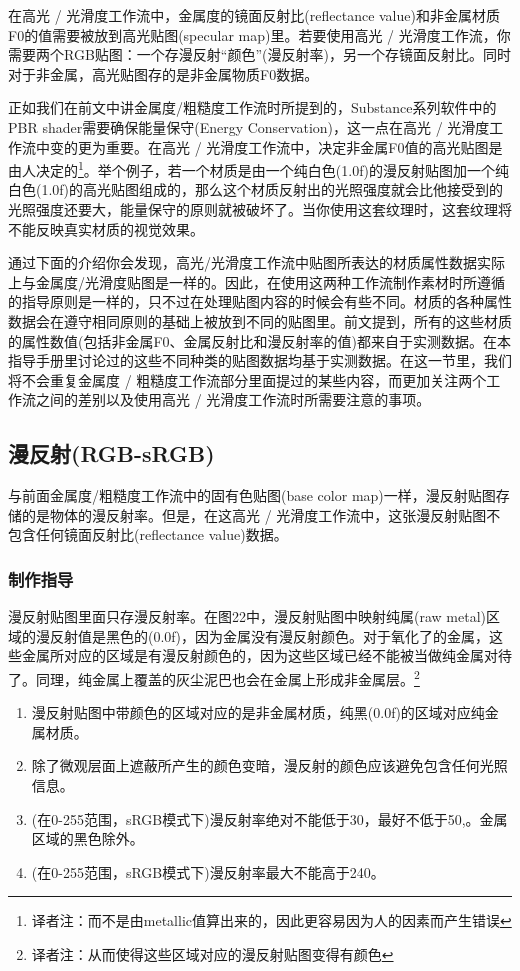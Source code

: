 在高光 / 光滑度工作流中，金属度的镜面反射比(reflectance value)和非金属材质F0的值需要被放到高光贴图(specular map)里。若要使用高光 / 光滑度工作流，你需要两个RGB贴图：一个存漫反射“颜色”(漫反射率)，另一个存镜面反射比。同时对于非金属，高光贴图存的是非金属物质F0数据。

正如我们在前文中讲金属度/粗糙度工作流时所提到的，Substance系列软件中的PBR shader需要确保能量保守(Energy Conservation)，这一点在高光 / 光滑度工作流中变的更为重要。在高光 / 光滑度工作流中，决定非金属F0值的高光贴图是由人决定的\footnote{译者注：而不是由metallic值算出来的，因此更容易因为人的因素而产生错误}。举个例子，若一个材质是由一个纯白色(1.0f)的漫反射贴图加一个纯白色(1.0f)的高光贴图组成的，那么这个材质反射出的光照强度就会比他接受到的光照强度还要大，能量保守的原则就被破坏了。当你使用这套纹理时，这套纹理将不能反映真实材质的视觉效果。

通过下面的介绍你会发现，高光/光滑度工作流中贴图所表达的材质属性数据实际上与金属度/光滑度贴图是一样的。因此，在使用这两种工作流制作素材时所遵循的指导原则是一样的，只不过在处理贴图内容的时候会有些不同。材质的各种属性数据会在遵守相同原则的基础上被放到不同的贴图里。前文提到，所有的这些材质的属性数值(包括非金属F0、金属反射比和漫反射率的值)都来自于实测数据。在本指导手册里讨论过的这些不同种类的贴图数据均基于实测数据。在这一节里，我们将不会重复金属度 / 粗糙度工作流部分里面提过的某些内容，而更加关注两个工作流之间的差别以及使用高光 / 光滑度工作流时所需要注意的事项。

\subsection{漫反射(RGB-sRGB)}

与前面金属度/粗糙度工作流中的固有色贴图(base color map)一样，漫反射贴图存储的是物体的漫反射率。但是，在这高光 / 光滑度工作流中，这张漫反射贴图不包含任何镜面反射比(reflectance value)数据。

\subsubsection{制作指导}

漫反射贴图里面只存漫反射率。在图22中，漫反射贴图中映射纯属(raw metal)区域的漫反射值是黑色的(0.0f)，因为金属没有漫反射颜色。对于氧化了的金属，这些金属所对应的区域是有漫反射颜色的，因为这些区域已经不能被当做纯金属对待了。同理，纯金属上覆盖的灰尘泥巴也会在金属上形成非金属层。\footnote{译者注：从而使得这些区域对应的漫反射贴图变得有颜色}

\begin{enumerate}
\item 漫反射贴图中带颜色的区域对应的是非金属材质，纯黑(0.0f)的区域对应纯金属材质。
\item 除了微观层面上遮蔽所产生的颜色变暗，漫反射的颜色应该避免包含任何光照信息。
\item (在0-255范围，sRGB模式下)漫反射率绝对不能低于30，最好不低于50,。金属区域的黑色除外。
\item (在0-255范围，sRGB模式下)漫反射率最大不能高于240。
\end{enumerate}

